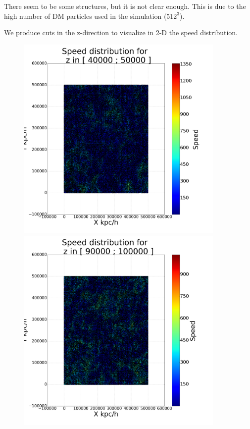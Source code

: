 \documentclass[12pt]{article}
\begin{document}
There seem to be some structures, but it is not clear enough. This is due to the high number of DM particles used in the simulation ($512^3$). 


We produce cuts in the z-direction to visualize in 2-D the speed distribution. \\


\begin{figure}[ht]
\centering
\begin{minipage}{.45\textwidth}
  \centering
  \includegraphics[width=0.9\textwidth]{graphs/scatter_magnitud_vel50000.png}
\end{minipage}%
\begin{minipage}{.45\textwidth}
  \centering
  \includegraphics[width=0.9\textwidth]{graphs/scatter_magnitud_vel100000.png}

\end{minipage}
\end{figure}
\end{document}
